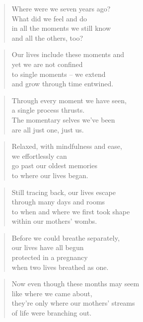 \documentclass[14pt,a4paper]{article}
\begin{document}
\begin{verse}
Where were we seven years ago?\\
What did we feel and do\\
in all the moments we still know\\
and all the others, too?
\end{verse}

\begin{verse}
Our lives include these moments and\\
yet we are not confined\\
to single moments – we extend\\
and grow through time entwined.
\end{verse}

\begin{verse}
Through every moment we have seen,\\
a single process thrusts.\\
The momentary selves we’ve been\\
are all just one, just us.
\end{verse}

\begin{verse}
Relaxed, with mindfulness and ease,\\
we effortlessly can\\
go past our oldest memories\\
to where our lives began.
\end{verse}

\begin{verse}
Still tracing back, our lives escape\\
through many days and rooms\\
to when and where we first took shape\\
within our mothers’ wombs.
\end{verse}

\begin{verse}
Before we could breathe separately,\\
our lives have all begun\\
protected in a pregnancy\\
when two lives breathed as one.
\end{verse}

\begin{verse}
Now even though these months may seem\\
like where we came about,\\
they’re only where our mothers’ streams\\
of life were branching out.
\end{verse}
\end{document}
